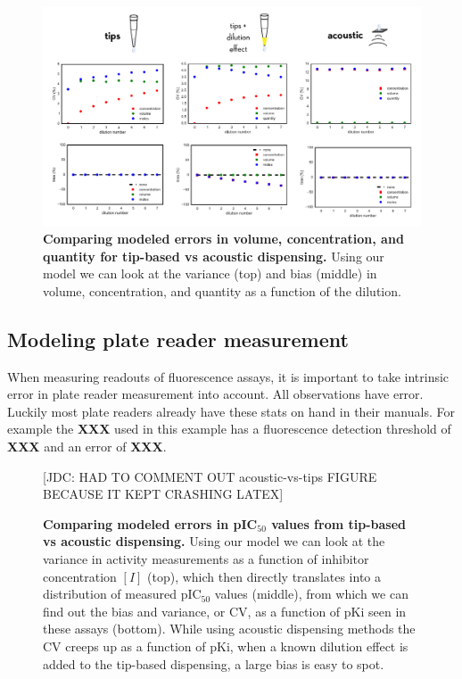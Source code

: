 \documentclass[aps,pre,twocolumn,nofootinbib,superscriptaddress,linenumbers]{revtex4-1}
\begin{document}
\begin{figure}[tb]
    \includegraphics[width=1.0\textwidth]{../figures/volumes-n-concentrations.pdf}

  \caption{{\bf Comparing modeled errors in volume, concentration, and quantity for tip-based vs acoustic dispensing.}
  Using our model we can look at the variance (top) and bias (middle) in volume, concentration, and quantity as a function of the dilution.
  }
  \label{fig:volumes-n-concentrations}
\end{figure}


\subsection*{Modeling plate reader measurement}

When measuring readouts of fluorescence assays, it is important to take intrinsic error in plate reader measurement into account. All observations have error. 
Luckily most plate readers already have these stats on hand in their manuals. 
For example the {\bf XXX} used in this example has a fluorescence detection threshold of {\bf XXX} and an error of {\bf XXX}.

\begin{figure}[tb]
  {\color{red}[JDC: HAD TO COMMENT OUT acoustic-vs-tips FIGURE BECAUSE IT KEPT CRASHING LATEX]}
  
  \caption{{\bf Comparing modeled errors in pIC$_{50}$ values from tip-based vs acoustic dispensing.}
  Using our model we can look at the variance in activity measurements as a function of inhibitor concentration $[I]$ (top), which then directly translates into a distribution of measured pIC$_{50}$ values (middle), from which we can find out the bias and variance, or CV, as a function of pKi seen in these assays (bottom). While using acoustic dispensing methods the CV creeps up as a function of pKi, when a known dilution effect is added to the tip-based dispensing, a large bias is easy to spot.
  }
  \label{fig:acoustic-vs-tips}
\end{figure}
\end{document}
